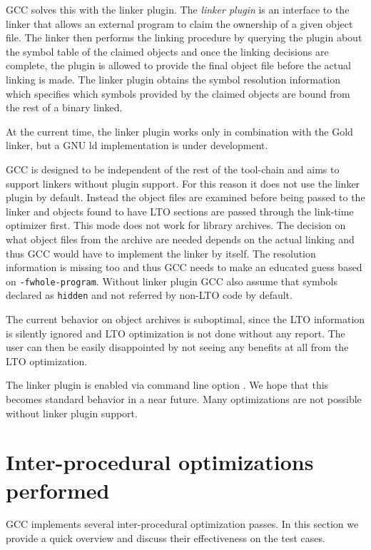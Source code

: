 \documentclass[final]{ols}
\begin{document}
GCC solves this with the linker plugin.  The {\em linker plugin} \cite{plugin} is
an interface to the linker that allows an external program to claim the ownership of a given
object file.  The linker then performs the linking procedure by querying the plugin about
the symbol table of the claimed objects and once the linking decisions are complete, the plugin is allowed
to provide the final object file before the actual linking is made. The linker
plugin obtains the symbol resolution information which specifies which symbols
provided by the claimed objects are bound from the rest of a binary linked.

At the current time, the linker plugin  works only in combination with the Gold
linker,  but a GNU ld implementation is under development. 

GCC is designed to be independent of the rest of the tool-chain and aims to
support linkers without plugin support. For this reason it does not use the
linker plugin by default.  Instead the object files are examined before being
passed to the linker and objects found to have LTO sections are passed through
the link-time optimizer first.  This mode does not work for library
archives. The decision on what object files from the archive are needed
depends on the actual linking and thus GCC would have to implement the linker
by itself. The resolution information is missing too and thus GCC needs to make
an educated guess based on {\tt -fwhole-program}.  Without linker plugin
GCC also assume that symbols declared as {\tt hidden} and not referred by
non-LTO code by default.

The current behavior on object archives is suboptimal, since the LTO
information is silently ignored and LTO optimization is not done without any
report.  The user can then be easily disappointed by not seeing any
benefits at all from the LTO optimization.

The linker plugin is enabled via command line option .
We hope that this becomes standard behavior in a near future. Many optimizations
are not possible without linker plugin support.

\section{Inter-procedural optimizations performed}
\label{ipasect}

GCC implements several inter-procedural optimization passes. In this section
we provide a quick overview and discuss their effectiveness on the test cases.
\end{document}
